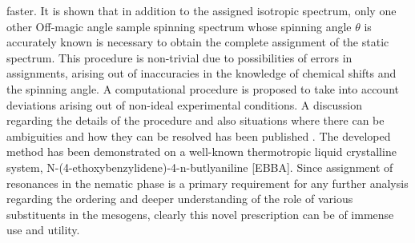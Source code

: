 faster. It is shown that in addition to the assigned isotropic spectrum, only one
other Off-magic angle sample spinning spectrum whose spinning angle $\theta$ is
accurately known is necessary to obtain the complete assignment of the static
spectrum. This procedure is non-trivial due to possibilities of errors in
assignments, arising out of inaccuracies in the knowledge of chemical shifts and
the spinning angle. A computational procedure is proposed to take into account
deviations arising out of non-ideal experimental conditions. A discussion
regarding the details of the procedure and also situations where there can be
ambiguities and how they can be resolved has been published \cite{chap31-key5}. The developed
method has been demonstrated on a well-known thermotropic liquid crystalline
system, N-(4-ethoxybenzylidene)-4-n-butlyaniline [EBBA]. Since assignment of
resonances in the nematic phase is a primary requirement for any further analysis
regarding the ordering and deeper understanding of the role of various
substituents in the mesogens, clearly this novel prescription can be of immense
use and utility.

